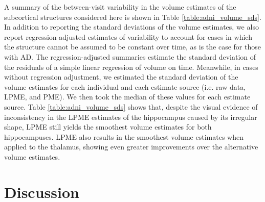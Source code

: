 \documentclass[12pt]{article}
\theoremstyle{definition}
\begin{document}
A summary of the between-visit variability in the volume estimates of the subcortical structures considered here is shown in Table \ref{table:adni_volume_sds}. In addition to reporting the standard deviations of the volume estimates, we also report regression-adjusted estimates of variability to account for cases in which the structure cannot be assumed to be constant over time, as is the case for those with AD. The regression-adjusted summaries estimate the standard deviation of the residuals of a simple linear regression of volume on time. Meanwhile, in cases without regression adjustment, we estimated the standard deviation of the volume estimates for each individual and each estimate source (i.e. raw data, LPME, and PME). We then took the median of these values for each estimate source. Table \ref{table:adni_volume_sds} shows that, despite the visual evidence of inconsistency in the LPME estimates of the hippocampus caused by its irregular shape, LPME still yields the smoothest volume estimates for both hippocampuses. LPME also results in the smoothest volume estimates when applied to the thalamus, showing even greater improvements over the alternative volume estimates.










\section{Discussion}\label{s:discussion}
\end{document}
